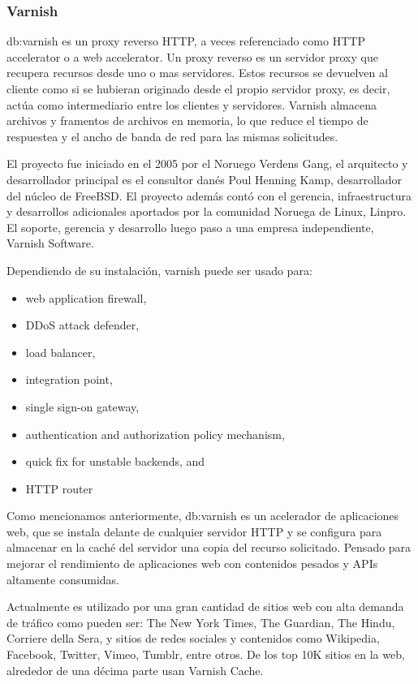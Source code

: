 \subsubsection{Varnish}
\label{soa:tecnologias:varnish}

\gls{db:varnish} es un proxy reverso HTTP, a veces referenciado como HTTP accelerator o a web accelerator.  Un proxy reverso es un servidor proxy que recupera recursos desde uno o mas servidores.  Estos recursos se devuelven al cliente como si se hubieran originado desde el propio servidor proxy, es decir, actúa como intermediario entre los clientes y servidores.
Varnish almacena archivos y framentos de archivos en memoria, lo que reduce el tiempo de respuestea y el ancho de banda de red para las mismas solicitudes.\cite[p.~20]{varnish2016}

El proyecto fue iniciado en el 2005 por el Noruego Verdens Gang, el arquitecto y desarrollador principal es el consultor danés Poul Henning Kamp, desarrollador del núcleo de FreeBSD. El proyecto además contó con el gerencia, infraestructura y desarrollos adicionales aportados por la comunidad Noruega de Linux, Linpro. El soporte, gerencia y desarrollo luego paso a una empresa independiente, Varnish Software.

Dependiendo de su instalación, varnish puede ser usado para:

\begin{itemize}
  \item web application firewall,
  \item DDoS attack defender,
  \item load balancer,
  \item integration point,
  \item single sign-on gateway,
  \item authentication and authorization policy mechanism,
  \item quick fix for unstable backends, and
  \item HTTP router
\end{itemize}

Como mencionamos anteriormente, \gls{db:varnish} es un acelerador de aplicaciones web, que se instala delante de cualquier servidor HTTP y se configura para almacenar en la caché del servidor una copia del recurso solicitado. Pensado para mejorar el rendimiento de aplicaciones web con contenidos pesados y APIs altamente consumidas.

Actualmente es utilizado por una gran cantidad de sitios web con alta demanda de tráfico como pueden ser: The New York Times, The Guardian, The Hindu, Corriere della Sera, y sitios de redes sociales y contenidos como Wikipedia, Facebook, Twitter, Vimeo, Tumblr, entre otros. De los top 10K sitios en la web, alrededor de una décima parte usan Varnish Cache.


